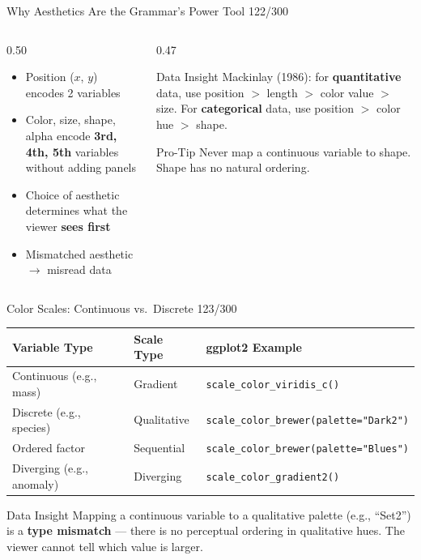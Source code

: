 \documentclass[10pt]{beamer}
\newcommand{\smark}[1]{\hfill{\scriptsize\color{codegray}#1}}
\begin{document}
\begin{frame}{Why Aesthetics Are the Grammar's Power Tool}
\smark{122/300}
\begin{columns}[T]
\begin{column}{0.50\textwidth}
\begin{itemize}
    \item Position ($x$, $y$) encodes 2 variables
    \item Color, size, shape, alpha encode \textbf{3rd, 4th, 5th} variables without adding panels
    \item Choice of aesthetic determines what the viewer \textbf{sees first}
    \item Mismatched aesthetic $\to$ misread data
\end{itemize}
\end{column}
\begin{column}{0.47\textwidth}
\begin{exampleblock}{Data Insight}
    \scriptsize Mackinlay (1986): for \textbf{quantitative} data, use position $>$ length $>$ color value $>$ size. For \textbf{categorical} data, use position $>$ color hue $>$ shape.
\end{exampleblock}
\vspace{0.2cm}
\begin{alertblock}{Pro-Tip}
    \scriptsize Never map a continuous variable to shape. Shape has no natural ordering.
\end{alertblock}
\end{column}
\end{columns}
\end{frame}

\begin{frame}{Color Scales: Continuous vs.\ Discrete}
\smark{123/300}
\centering\small
\begin{tabular}{@{}lll@{}}
    \toprule
    \textbf{Variable Type} & \textbf{Scale Type} & \textbf{ggplot2 Example} \\
    \midrule
    Continuous (e.g., mass)    & Gradient   & \texttt{scale\_color\_viridis\_c()} \\
    Discrete (e.g., species)   & Qualitative & \texttt{scale\_color\_brewer(palette="Dark2")} \\
    Ordered factor             & Sequential  & \texttt{scale\_color\_brewer(palette="Blues")} \\
    Diverging (e.g., anomaly)  & Diverging   & \texttt{scale\_color\_gradient2()} \\
    \bottomrule
\end{tabular}

\vspace{0.3cm}
\begin{exampleblock}{Data Insight}
    \scriptsize Mapping a continuous variable to a qualitative palette (e.g., ``Set2'') is a \textbf{type mismatch} --- there is no perceptual ordering in qualitative hues. The viewer cannot tell which value is larger.
\end{exampleblock}
\end{frame}
\end{document}
